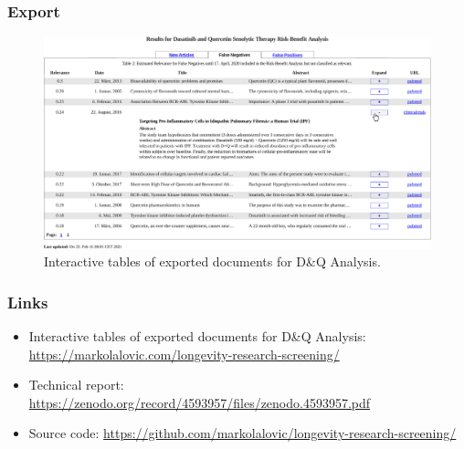 \documentclass[10pt, xcolor={dvipsnames}]{beamer}
\begin{document}
\begin{frame}
\frametitle{Export}
\begin{figure}
\centering
\includegraphics[width=1\textwidth]{../report/tables/export-tables/export-tables-crop.pdf}
\caption{Interactive tables of exported documents for D\&Q Analysis.}
\label{fig:export}
\end{figure}
\end{frame}

\begin{frame}
\frametitle{Links}
\begin{itemize}
\item Interactive tables of exported documents for D\&Q Analysis: \url{https://markolalovic.com/longevity-research-screening/}
\item Technical report: \url{https://zenodo.org/record/4593957/files/zenodo.4593957.pdf}
\item Source code: \url{https://github.com/markolalovic/longevity-research-screening/}
\end{itemize}
\end{frame}
\end{document}

